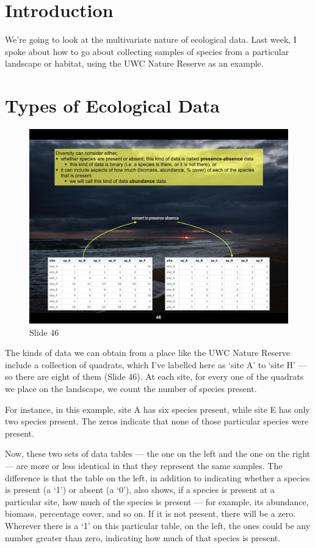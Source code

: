 \documentclass[
  10pt,
]{book}
\begin{document}
\section{Introduction}\label{introduction}

We're going to look at the multivariate nature of ecological data. Last
week, I spoke about how to go about collecting samples of species from a
particular landscape or habitat, using the UWC Nature Reserve as an
example.

\section{Types of Ecological Data}\label{types-of-ecological-data}

\begin{figure}[ht]
\centering
\includegraphics[width=0.8\linewidth]{../images/BDC334/BDC334-046.jpeg}
\caption*{Slide 46}
\end{figure}

The kinds of data we can obtain from a place like the UWC Nature Reserve
include a collection of quadrats, which I've labelled here as `site A'
to `site H' --- so there are eight of them (Slide 46). At each site, for
every one of the quadrats we place on the landscape, we count the number
of species present.

For instance, in this example, site A has six species present, while
site E has only two species present. The zeros indicate that none of
those particular species were present.

Now, these two sets of data tables --- the one on the left and the one
on the right --- are more or less identical in that they represent the
same samples. The difference is that the table on the left, in addition
to indicating whether a species is present (a `1') or absent (a `0'),
also shows, if a species is present at a particular site, how much of
the species is present --- for example, its abundance, biomass,
percentage cover, and so on. If it is not present, there will be a zero.
Wherever there is a `1' on this particular table, on the left, the ones
could be any number greater than zero, indicating how much of that
species is present.
\end{document}
